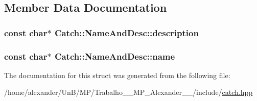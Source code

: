\subsection{Member Data Documentation}
\hypertarget{structCatch_1_1NameAndDesc_a3463a23ff65ce494fc380452b57b7970}{
\subsubsection[{description}]{\setlength{\rightskip}{0pt plus 5cm}const char$\ast$ Catch\-::\-Name\-And\-Desc\-::description}}\label{structCatch_1_1NameAndDesc_a3463a23ff65ce494fc380452b57b7970}
\hypertarget{structCatch_1_1NameAndDesc_a374b4ed8be3cf98be20ebde5273bde51}{
\subsubsection[{name}]{\setlength{\rightskip}{0pt plus 5cm}const char$\ast$ Catch\-::\-Name\-And\-Desc\-::name}}\label{structCatch_1_1NameAndDesc_a374b4ed8be3cf98be20ebde5273bde51}


The documentation for this struct was generated from the following file\-:\begin{DoxyCompactItemize}
\item 
/home/alexander/\-Un\-B/\-M\-P/\-Trabalho\-\_\-\_\-\-M\-P\-\_\-\-Alexander\-\_\-\_/include/\hyperlink{catch_8hpp}{catch.\-hpp}\end{DoxyCompactItemize}
